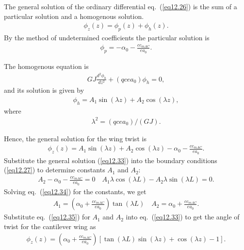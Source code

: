 \documentclass{AeroStructure-ERJohnson}
\begin{document}
The general solution of the ordinary differential eq.~(\ref{eq12.26}) is the sum of a particular solution and a homogenous solution.
\begin{align}\label{eq12.28}
\phi_{z}(z)=\phi_{p}(z)+\phi_{h}(z).
\end{align}
By the method of undetermined coefficients the particular solution is
\begin{align}\label{eq12.29}
\phi_{p}=-\alpha_{0}-\frac{c c_{m A C}}{e a_{0}}.
\end{align}

\vspace*{-1pc}

The homogenous equation is
\begin{align}\label{eq12.30}
G J \frac{d^{2} \phi_{h}}{d z^{2}}+\left(q c e a_{0}\right) \phi_{h}=0,
\end{align}
and its solution is given by
\begin{align}\label{eq12.31}
\phi_{h}=A_{1} \sin (\lambda z)+A_{2} \cos (\lambda z),
\end{align}
where
\begin{align}\label{eq12.32}
\lambda^{2}=\left(q c e a_{0}\right) /(G J).
\end{align}

Hence, the general solution for the wing twist is
\begin{align}\label{eq12.33}
\phi_{z}(z)=A_{1} \sin (\lambda z)+A_{2} \cos (\lambda z)-\alpha_{0}-\frac{c c_{m A C}}{e a_{0}}.
\end{align}
Substitute the general solution (\ref{eq12.33}) into the boundary conditions (\ref{eq12.27}) to determine constants $A_{1}$ and $A_{2}$:
\begin{align}\label{eq12.34}
A_{2}-\alpha_{0}-\frac{c c_{m A C}}{e a_{0}}=0 \quad A_{1} \lambda \cos (\lambda L)-A_{2} \lambda \sin (\lambda L)=0.
\end{align}
Solving eq.~(\ref{eq12.34}) for the constants, we get
\begin{align}\label{eq12.35}
A_{1}=\left(\alpha_{0}+\frac{c c_{m A C}}{e a_{0}}\right) \tan (\lambda L) \quad A_{2}=\alpha_{0}+\frac{c c_{m A C}}{e a_{0}}.
\end{align}
Substitute eq.~(\ref{eq12.35}) for ${A}_1$ and ${A}_2$ into eq.~(\ref{eq12.33}) to get the angle of twist for the cantilever wing as
\begin{align}\label{eq12.36}
\phi_{z}(z)=\left(\alpha_{0}+\frac{c c_{m A C}}{e a_{0}}\right)[\tan (\lambda L) \sin (\lambda z)+\cos (\lambda z)-1].
\end{align}
\end{document}
